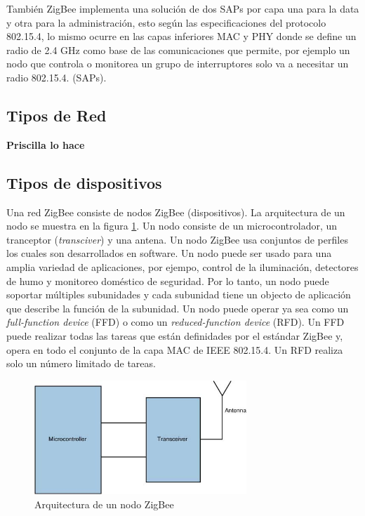 \documentclass[10pt,journal,compsoc]{IEEEtran}
\begin{document}
También ZigBee implementa una solución de dos SAPs por capa una para la data y otra para la administración, esto según las especificaciones del protocolo 802.15.4, lo mismo ocurre en las capas inferiores MAC y PHY donde se define un radio de 2.4 GHz como base de las comunicaciones que permite, por ejemplo un nodo que controla o monitorea un grupo de interruptores solo va a necesitar un radio 802.15.4. (SAPs).

\subsection{Tipos de Red}

\textbf{Priscilla lo hace}

\subsection{Tipos de dispositivos}
Una red ZigBee consiste de nodos ZigBee (dispositivos). La arquitectura de un nodo se muestra en la figura \ref{fig:device-architecture}. Un nodo consiste de un microcontrolador, un tranceptor (\emph{transciver}) y una antena. Un nodo ZigBee usa conjuntos de perfiles los cuales son desarrollados en software. Un nodo puede ser usado para una amplia variedad de aplicaciones, por ejempo, control de la iluminación, detectores de humo y monitoreo doméstico de seguridad. Por lo tanto, un nodo puede soportar múltiples subunidades y cada subunidad tiene un objecto de aplicación que describe la función de la subunidad. Un nodo puede operar ya sea como un \emph{full-function device} (FFD) o como un \emph{reduced-function device} (RFD). Un FFD puede realizar todas las tareas que están definidades por el estándar ZigBee y, opera en todo el conjunto de la capa MAC de IEEE 802.15.4. Un RFD realiza solo un número limitado de tareas.

\begin{figure}[h]
    \centering
    \includegraphics[width=8cm]{device-architecture}
    \caption{Arquitectura de un nodo ZigBee}
    \label{fig:device-architecture}
\end{figure}
\end{document}
